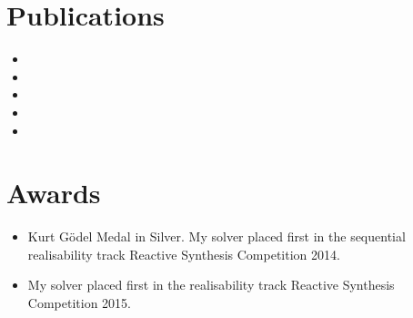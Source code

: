 \documentclass[a4paper,twoside,openright,11pt,oldfontcommands]{memoir}
\theoremstyle{definition}
\begin{document}
\chapter{Publications}
\begin{itemize}
    \item {}
    \item {}
    \item {}
    \item {}
    \item {}
\end{itemize}

{\let\clearpage\relax\chapter*{Awards}}
\begin{itemize}
    \item Kurt G{\"o}del Medal in Silver. My solver placed first in the sequential realisability track Reactive Synthesis Competition 2014. 
    \item My solver placed first in the realisability track Reactive Synthesis Competition 2015. 
\end{itemize}

\clearpage


\tableofcontents
\clearpage

\listoffigures

\listoftables

\mainmatter















\appendix




%

\backmatter
\cleardoublepage


\end{document}
